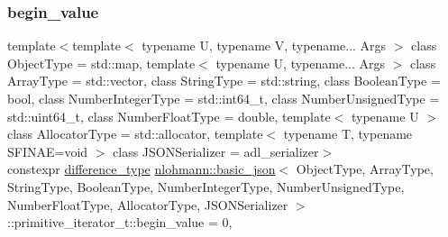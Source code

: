 \subsubsection{\texorpdfstring{begin\+\_\+value}{begin\_value}}
{\footnotesize\ttfamily template$<$template$<$ typename U, typename V, typename... Args $>$ class Object\+Type = std\+::map, template$<$ typename U, typename... Args $>$ class Array\+Type = std\+::vector, class String\+Type  = std\+::string, class Boolean\+Type  = bool, class Number\+Integer\+Type  = std\+::int64\+\_\+t, class Number\+Unsigned\+Type  = std\+::uint64\+\_\+t, class Number\+Float\+Type  = double, template$<$ typename U $>$ class Allocator\+Type = std\+::allocator, template$<$ typename T, typename S\+F\+I\+N\+A\+E=void $>$ class J\+S\+O\+N\+Serializer = adl\+\_\+serializer$>$ \\
constexpr \hyperlink{classnlohmann_1_1basic__json_afe7c1303357e19cea9527af4e9a31d8f}{difference\+\_\+type} \hyperlink{classnlohmann_1_1basic__json}{nlohmann\+::basic\+\_\+json}$<$ Object\+Type, Array\+Type, String\+Type, Boolean\+Type, Number\+Integer\+Type, Number\+Unsigned\+Type, Number\+Float\+Type, Allocator\+Type, J\+S\+O\+N\+Serializer $>$\+::primitive\+\_\+iterator\+\_\+t\+::begin\+\_\+value = 0\hspace{0.3cm}{\ttfamily [static]}, {\ttfamily [private]}}

\mbox{\label{classnlohmann_1_1basic__json_1_1primitive__iterator__t_af911926f73b6c1f697e68eda3b3e2047}} 
